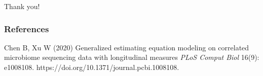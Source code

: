 \documentclass{beamer}
\begin{document}
\begin{frame}[t]{Thank you!}

\end{frame}


\begin{frame}
\frametitle{References}
\footnotesize{
\begin{thebibliography}{99} %
 Chen B, Xu W (2020)
\newblock Generalized estimating equation modeling on correlated microbiome sequencing data with longitudinal measures
\newblock \emph{PLoS Comput Biol } 16(9): e1008108. https://doi.org/10.1371/journal.pcbi.1008108.
\end{thebibliography}
}
\end{frame}



\end{document}
